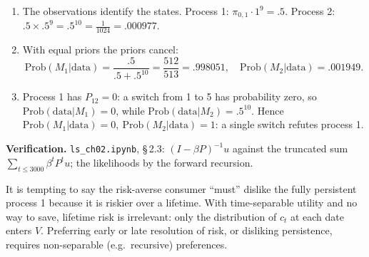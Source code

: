 \documentclass[12pt, letterpaper]{article}
\newcommand{\nb}[1]{\texttt{ls\_ch02.ipynb}, \S\,#1}
\begin{document}
\begin{tcolorbox}[oddbox,title={Exercise 2.3 \quad Discounted Utility and Bayesian Model Choice}]
\begin{enumerate}
The consumer is \textbf{indifferent} in both cases.

\emph{Reading.} Both chains start from $[.5,.5]$, which is stationary for both, so in every period
$c_t$ equals 1 or 5 with probability one half under either process. Time-separable expected utility
only sees these period-by-period marginals, so it is blind to the serial correlation: a single coin
flip at $t=0$ fixing consumption for life (process 1) is valued exactly like a fresh flip every
period (process 2). Raising $\gamma$ changes the level of $V$, never the ranking.

\item The observations identify the states. Process 1: $\pi_{0,1}\cdot1^9=\boxed{.5}$.
Process 2: $.5\times.5^9=.5^{10}=\frac{1}{1024}=\boxed{.000977}$.

\item With equal priors the priors cancel:
\[
\text{Prob}(M_1|\text{data})=\frac{.5}{.5+.5^{10}}=\frac{512}{513}=\boxed{.998051},\quad
\text{Prob}(M_2|\text{data})=\boxed{.001949}.
\]
\item Process 1 has $P_{12}=0$: a switch from 1 to 5 has probability zero, so
$\text{Prob}(\text{data}|M_1)=0$, while $\text{Prob}(\text{data}|M_2)=.5^{10}$. Hence
$\boxed{\text{Prob}(M_1|\text{data})=0,\ \text{Prob}(M_2|\text{data})=1}$: a single switch refutes
process 1.
\end{enumerate}

\textbf{Verification.} \nb{2.3}: $(I-\beta P)^{-1}u$ against the truncated sum
$\sum_{t\le3000}\beta^tP^tu$; the likelihoods by the forward recursion. \checkmark
\end{tcolorbox}

\begin{tcolorbox}[trapbox]
It is tempting to say the risk-averse consumer ``must'' dislike the fully persistent process 1
because it is riskier over a lifetime. With time-separable utility and no way to save, lifetime
risk is irrelevant: only the distribution of $c_t$ at each date enters $V$. Preferring early or
late resolution of risk, or disliking persistence, requires non-separable (e.g.\ recursive)
preferences.
\end{tcolorbox}
\end{document}
